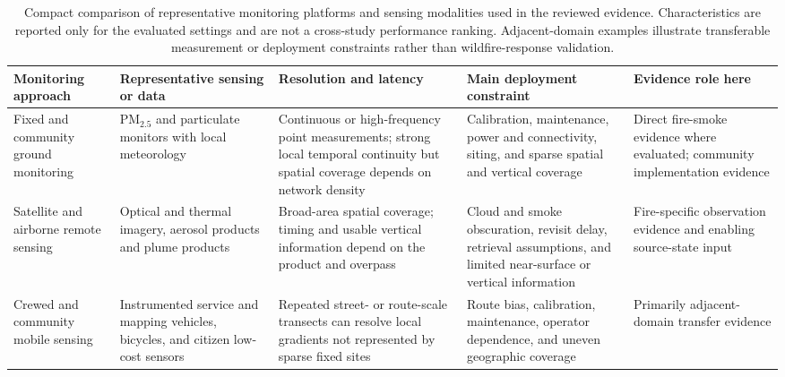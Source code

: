 \begin{table}[H]
\color{revisionblue}
\centering
\caption{Compact comparison of representative monitoring platforms and sensing modalities used in the reviewed evidence. Characteristics are reported only for the evaluated settings and are not a cross-study performance ranking. Adjacent-domain examples illustrate transferable measurement or deployment constraints rather than wildfire-response validation.}
\label{tab:platform_sensor_matrix}
\footnotesize
{}
\renewcommand{\arraystretch}{1.55}
\setlength{\extrarowheight}{2pt}
\begin{tabularx}{\linewidth}{>{\raggedright\arraybackslash}p{2.6cm}
                >{\raggedright\arraybackslash}p{3.05cm}
                >{\raggedright\arraybackslash}p{3.25cm}
                >{\raggedright\arraybackslash}p{3.55cm}
                X}
\toprule
\rowcolor{black!7}
\textbf{Monitoring approach} &
\textbf{Representative sensing or data} &
\textbf{Resolution and latency} &
\textbf{Main deployment constraint} &
\textbf{Evidence role here}\\
\midrule
Fixed and community ground monitoring &
PM$_{2.5}$ and particulate monitors with local meteorology &
Continuous or high-frequency point measurements; strong local temporal continuity but spatial coverage depends on network density &
Calibration, maintenance, power and connectivity, siting, and sparse spatial and vertical coverage &
Direct fire-smoke evidence where evaluated; community implementation evidence \\

Satellite and airborne remote sensing &
Optical and thermal imagery, aerosol products and plume products &
Broad-area spatial coverage; timing and usable vertical information depend on the product and overpass &
Cloud and smoke obscuration, revisit delay, retrieval assumptions, and limited near-surface or vertical information &
Fire-specific observation evidence and enabling source-state input \\

Crewed and community mobile sensing &
Instrumented service and mapping vehicles, bicycles, and citizen low-cost sensors~\citep{degroot2025snuffelfiets} &
Repeated street- or route-scale transects can resolve local gradients not represented by sparse fixed sites &
Route bias, calibration, maintenance, operator dependence, and uneven geographic coverage &
Primarily adjacent-domain transfer evidence \\


\end{tabularx}
\end{table}
